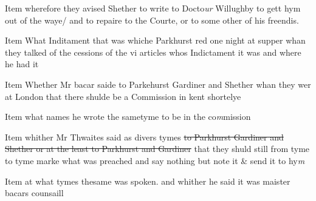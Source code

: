 \documentclass[12pt, a4paper]{book}
\begin{document}
				\marginpar[\vspace{0.5cm}{\textcolor{Gray}{15}}]{}
			
		\ifthenelse{\isodd{\thepage}}
		{\reversemarginpar}
		{\normalmarginpar}
		Item wherefore they avised Shether to write to Docto\textit{ur} Willughby
to gett hym out of the waye/ and to repaire to the Courte, or to
some other of his freendis.
 	
				\marginpar[\vspace{0.5cm}{\textcolor{Gray}{16}}]{}
			
		\ifthenelse{\isodd{\thepage}}
		{\reversemarginpar}
		{\normalmarginpar}
		Item What Inditament that was whiche Parkhurst red one night
at supper whan they talked of the cessions of the vi articles
whos Indictament it was and where he had it
 	
				\marginpar[\vspace{0.5cm}{\textcolor{Gray}{17}}]{}
			
		\ifthenelse{\isodd{\thepage}}
		{\reversemarginpar}
		{\normalmarginpar}
		Item Whether 
			Mr bacar saide to Parkehurst Gardiner and Shether whan
they wer at London that there shulde be a Commission in kent
shortelye
 	
				\marginpar[\vspace{0.5cm}{\textcolor{Gray}{18}}]{}
			
		\ifthenelse{\isodd{\thepage}}
		{\reversemarginpar}
		{\normalmarginpar}
		Item what names he wrote the sametyme to be in the co\textit{m}mission 

				\marginpar[\vspace{0.5cm}{\textcolor{Gray}{19}}]{}
			
		\ifthenelse{\isodd{\thepage}}
		{\reversemarginpar}
		{\normalmarginpar}
		Item whither Mr Thwaites said as divers tymes \sout{to Parkhurst
Gardiner and Shether or at the least to Parkhurst and 
Gardiner} that they shuld still from tyme to tyme marke
what was preached and say nothing but note it \& send
it to hy\textit{m}
			
 	
				\marginpar[\vspace{0.5cm}{\textcolor{Gray}{20}}]{}
			
		\ifthenelse{\isodd{\thepage}}
		{\reversemarginpar}
		{\normalmarginpar}
		Item at what tymes thesame was spoken. and whither he said 
it was maister bacars counsaill
 	
				\marginpar[\vspace{0.5cm}{\textcolor{Gray}{21}}]{}
			
\end{document}
